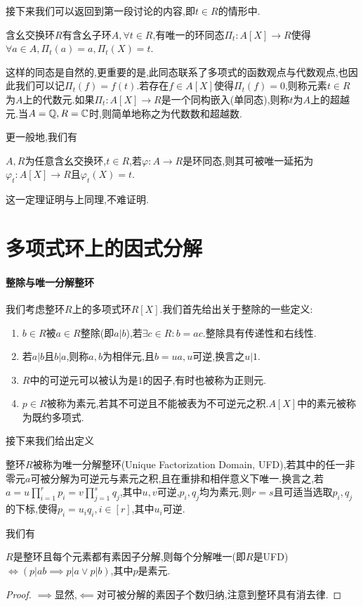 \documentclass[openany]{book}
\begin{document}
接下来我们可以返回到第一段讨论的内容,即$t\in R$的情形中.
\begin{theorem}
    含幺交换环$R$有含幺子环$A, \forall t\in R$,有唯一的环同态$\Pi_t:A[X]\to R$使得$\forall a\in A,\Pi_t(a)=a,\Pi_t(X)=t$.
\end{theorem}
这样的同态是自然的,更重要的是,此同态联系了多项式的函数观点与代数观点,也因此我们可以记$\Pi_t(f)=f(t)$.若存在$f\in A[X]$使得$\Pi_t(f)=0$,则称元素$t\in R$为$A$上的代数元.如果$\Pi_t:A[X]\to R$是一个同构嵌入(单同态),则称$t$为$A$上的超越元.当$A=\mathbb{Q}, R=\mathbb{C}$时,则简单地称之为代数数和超越数.

更一般地,我们有\begin{theorem}
    $A,R$为任意含幺交换环,$t\in R$,若$\varphi:A\to R$是环同态,则其可被唯一延拓为$\varphi_t:A[X]\to R$且$\varphi_t(X)=t$.
\end{theorem}
这一定理证明与上同理,不难证明.

\section{多项式环上的因式分解}
\paragraph{整除与唯一分解整环}我们考虑整环$R$上的多项式环$R[X]$.我们首先给出关于整除的一些定义:
\begin{enumerate}
    \item $b\in R$被$a\in R$整除(即$a|b$),若$\exists c\in R:b=ac$.整除具有传递性和右线性.
    \item 若$a|b$且$b|a$,则称$a,b$为相伴元,且$b=ua,u$可逆,换言之$u|1$.
    \item $R$中的可逆元可以被认为是1的因子,有时也被称为正则元.
    \item $p\in R$被称为素元,若其不可逆且不能被表为不可逆元之积.$A[X]$中的素元被称为既约多项式.
\end{enumerate}
接下来我们给出定义
\begin{definition}
    整环$R$被称为唯一分解整环(Unique Factorization Domain, UFD),若其中的任一非零元$a$可被分解为可逆元与素元之积,且在重排和相伴意义下唯一.换言之,若$a=u\prod_{i=1}^r p_i=v\prod_{j=1}^s q_j$,其中$u,v$可逆,$p_i,q_j$均为素元,则$r=s$且可适当选取$p_i,q_j$的下标,使得$p_i=u_iq_i,i\in [r]$,其中$u_i$可逆.
\end{definition}
我们有
\begin{theorem}\label{thm3}
    $R$是整环且每个元素都有素因子分解,则每个分解唯一(即$R$是UFD)$\iff (p|ab\implies p|a\lor p|b)$,其中$p$是素元.
\end{theorem}
\begin{proof}
    $\implies$显然,$\impliedby$对可被分解的素因子个数归纳,注意到整环具有消去律.
\end{proof}
\end{document}
